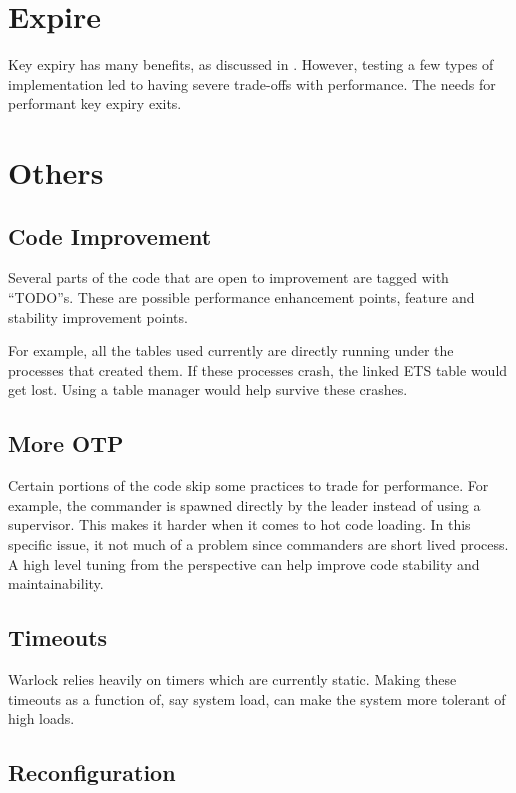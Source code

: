 \section{Expire}

Key expiry has many benefits, as discussed in . 
However, testing a few types of implementation led to having severe trade-offs
with performance. The needs for performant key expiry exits.

\section{Others}

\subsection{Code Improvement}

Several parts of the code that are open to improvement are tagged with 
``TODO''s. These are possible performance enhancement points, feature and
stability improvement points. 

For example, all the  tables used currently
are directly running under the processes that created them. If these processes
crash, the linked ETS table would get lost. Using a table manager would
help survive these crashes.

\subsection{More OTP}

Certain portions of the code skip some  practices to trade for
performance.
For example, the commander is spawned directly by the leader instead of using
a supervisor. This makes it harder when it comes to hot code loading. In this
specific issue, it not much of a problem since commanders are short lived
process. A high level tuning from the  perspective can help improve
code stability and maintainability.

\subsection{Timeouts}

Warlock relies heavily on timers which are currently static. Making these
timeouts as a function of, say system load, can make the system more tolerant
of high loads.

\subsection{Reconfiguration}

